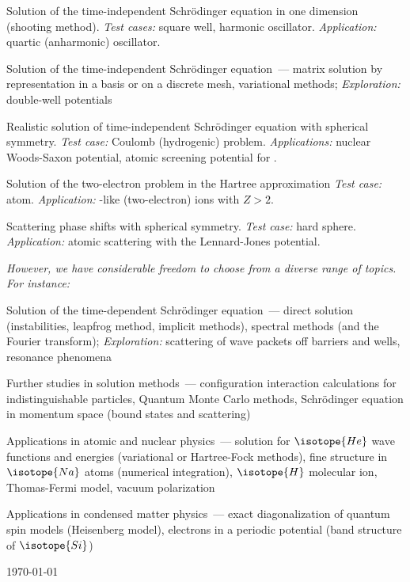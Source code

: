 \documentclass[12pt]{mcplain}
\begin{document}
\begin{leftindentlist*}{\baselineskip}

 \item Solution of the time-independent Schr\"odinger equation in one
 dimension (shooting method).  \textit{Test cases:} square well, harmonic oscillator.
 \textit{Application:} quartic (anharmonic) oscillator.

 \item Solution of the time-independent Schr\"odinger equation~---
 matrix solution by representation in a basis or on a discrete mesh, variational
 methods;
 \textit{Exploration:}  double-well potentials

 \item Realistic solution of time-independent Schr\"odinger equation
 with spherical symmetry.  \textit{Test case:} Coulomb (hydrogenic)
 problem. \textit{Applications:} nuclear Woods-Saxon potential, atomic
 screening potential for .

 \item Solution of the two-electron problem in the Hartree approximation
 \textit{Test case:}  atom. \textit{Application:} -like (two-electron) ions with $Z>2$.

 \item Scattering phase shifts with spherical symmetry.
 \textit{Test case:} hard sphere.
 \textit{Application:} atomic scattering with the Lennard-Jones potential.
\end{leftindentlist*}

\textit{However, we have considerable freedom to choose from a diverse range of topics.  For instance:}

\begin{leftindentlist*}{\baselineskip}
  \item Solution of the time-dependent Schr\"odinger equation~--- direct
  solution (instabilities, leapfrog method, implicit methods), spectral methods
  (and the Fourier transform);
  \textit{Exploration:} scattering of wave packets off barriers and
  wells, resonance phenomena

  \item Further studies in solution methods~--- configuration interaction
  calculations for indistinguishable particles, Quantum Monte Carlo methods,
  Schr\"odinger equation in momentum space (bound states and scattering)

  \item Applications in atomic and nuclear physics~--- solution for
  $\isotope{He}$ wave functions and energies (variational or Hartree-Fock
  methods),
  fine structure in $\isotope{Na}$ atoms (numerical
  integration), $\isotope{H}$ molecular ion, Thomas-Fermi model, vacuum
  polarization

  \item Applications in condensed matter physics~--- exact diagonalization of
  quantum spin models (Heisenberg model), electrons in a periodic potential
  (band structure of $\isotope{Si}$)


\end{leftindentlist*}



{\enlargethispage{20ex}\mbox{}\hfill{\scriptsize\today}}
\end{document}

